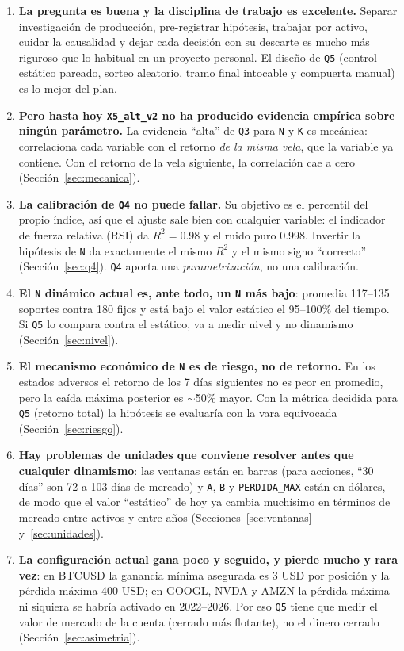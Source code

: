 \documentclass[11pt,a4paper]{article}
\newcommand{\code}[1]{\texttt{\small #1}}
\begin{document}
\begin{enumerate}[leftmargin=1.4em]
  \item \textbf{La pregunta es buena y la disciplina de trabajo es excelente.} Separar investigación de
        producción, pre-registrar hipótesis, trabajar por activo, cuidar la causalidad y dejar cada
        decisión con su descarte es mucho más riguroso que lo habitual en un proyecto personal. El
        diseño de \code{Q5} (control estático pareado, sorteo aleatorio, tramo final intocable y
        compuerta manual) es lo mejor del plan.
  \item \textbf{Pero hasta hoy \code{X5\_alt\_v2} no ha producido evidencia empírica sobre ningún parámetro.}
        La evidencia ``alta'' de \code{Q3} para \code{N} y \code{K} es mecánica: correlaciona cada
        variable con el retorno \emph{de la misma vela}, que la variable ya contiene. Con el retorno de
        la vela siguiente, la correlación cae a cero (Sección~\ref{sec:mecanica}).
  \item \textbf{La calibración de \code{Q4} no puede fallar.} Su objetivo es el percentil del propio
        índice, así que el ajuste sale bien con cualquier variable: el indicador de fuerza relativa
        (RSI) da $R^2=0.98$ y el ruido puro $0.998$. Invertir la hipótesis de \code{N} da exactamente el
        mismo $R^2$ y el mismo signo ``correcto'' (Sección~\ref{sec:q4}). \code{Q4} aporta una
        \emph{parametrización}, no una calibración.
  \item \textbf{El \code{N} dinámico actual es, ante todo, un \code{N} más bajo}: promedia 117--135
        soportes contra 180 fijos y está bajo el valor estático el 95--100\% del tiempo. Si \code{Q5}
        lo compara contra el estático, va a medir nivel y no dinamismo (Sección~\ref{sec:nivel}).
  \item \textbf{El mecanismo económico de \code{N} es de riesgo, no de retorno.} En los estados
        adversos el retorno de los 7 días siguientes no es peor en promedio, pero la caída máxima
        posterior es $\sim$50\% mayor. Con la métrica decidida para \code{Q5} (retorno total) la
        hipótesis se evaluaría con la vara equivocada (Sección~\ref{sec:riesgo}).
  \item \textbf{Hay problemas de unidades que conviene resolver antes que cualquier dinamismo}: las
        ventanas están en barras (para acciones, ``30 días'' son 72 a 103 días de mercado) y \code{A},
        \code{B} y \code{PERDIDA\_MAX} están en dólares, de modo que el valor ``estático'' de hoy ya
        cambia muchísimo en términos de mercado entre activos y entre años (Secciones~\ref{sec:ventanas}
        y~\ref{sec:unidades}).
  \item \textbf{La configuración actual gana poco y seguido, y pierde mucho y rara vez}: en BTCUSD la
        ganancia mínima asegurada es 3 USD por posición y la pérdida máxima 400 USD; en GOOGL, NVDA y AMZN
        la pérdida máxima ni siquiera se habría activado en 2022--2026. Por eso \code{Q5} tiene que medir
        el valor de mercado de la cuenta (cerrado más flotante), no el dinero cerrado
        (Sección~\ref{sec:asimetria}).
\end{enumerate}
\end{document}
